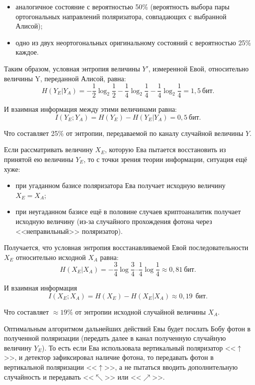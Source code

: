 \begin{itemize}
	\item аналогичное состояние с вероятностью 50\% (вероятность выбора пары ортогональных направлений поляризатора, совпадающих с выбранной Алисой);
	\item одно из двух неортогональных оригинальному состояний с вероятностью 25\% каждое.
\end{itemize}

Таким образом, условная энтропия величины $Y'$, измеренной Евой, относительно величины Y, переданной Алисой, равна:
\[ H \left( Y_E | Y_A \right) = - \frac{1}{2} \log_2 \frac{1}{2} - \frac{1}{4} \log_2 \frac{1}{4} - \frac{1}{4} \log_2 \frac{1}{4} = 1,5~\text{бит}. \]

И взаимная информация между этими величинами равна:
\[ I \left( Y_E ; Y_A \right) = H \left( Y_E \right) - H ( Y_E | Y_A ) = 0,5~\text{бит}.\]

Что составляет 25\% от энтропии, передаваемой по каналу случайной величины $Y$.

Если рассматривать величину $X_E$, которую Ева пытается восстановить из принятой ею величины $Y_E$, то с точки зрения теории информации, ситуация ещё хуже:

\begin{itemize}
	\item при угаданном базисе поляризатора Ева получает исходную величину $X_E = X_A$;
	\item при неугаданном базисе ещё в половине случаев криптоаналитик получает исходную величину (из-за случайного прохождения фотона через <<неправильный>> поляризатор).
\end{itemize}

Получается, что условная энтропия восстанавливаемой Евой последовательности $X_E$ относительно исходной $X_A$ равна:
\[ H \left( X_E | X_A \right) = - \frac{3}{4} \log \frac{3}{4} – \frac{1}{4} \log \frac{1}{4} \approx 0,81~\text{бит.}\]

И взаимная информация
\[ I \left( X_E; X_A \right) = H \left( X_E \right) - H \left( X_E | X_A \right) \approx 0,19~~\text{бит}. \]

Что составляет $\approx 19\%$ от энтропии исходной случайной величины $X_A$.

Оптимальным алгоритмом дальнейших действий Евы будет послать Бобу фотон в полученной поляризации (передать далее в канал полученную случайную величину $Y_E$). То есть если Ева использовала вертикальный поляризатор <<$\uparrow$>>, и детектор зафиксировал наличие фотона, то передавать фотон в вертикальной поляризации <<$\uparrow$>>, а не пытаться вводить дополнительную случайность и передавать <<$\nwarrow$>> или <<$\nearrow$>>.

